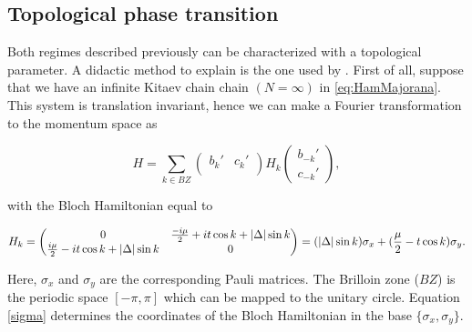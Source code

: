 


\subsection{Topological phase transition \label{subsec:top}}

Both regimes described previously  can be characterized with a topological parameter.  A didactic method to explain is the one used by \citeauthor{alicea_new_2012}\cite{alicea_new_2012}. First of all, suppose that we have an infinite Kitaev chain chain $(N=\infty)$ in  \eqref{eq:HamMajorana}. This system is translation invariant, hence we can make a Fourier transformation to the momentum space as

\begin{equation}
    H = 
    \sum_{k \in BZ} 
    \begin{pmatrix} 
      b_k'  & c_{k}'\\  
    \end{pmatrix}
    H_k 
    \begin{pmatrix} 
      b_{-k}'     \\ 
      c_{-k}' 
    \end{pmatrix},
    \label{PBCHam2}
\end{equation}

\noindent with the Bloch Hamiltonian equal to 

\begin{equation}
H_k = \begin{pmatrix} 
      0    &  \frac{-i \mu}{2} + it \cos k + \vert \Delta \vert  \sin k  \\ 
       \frac{i \mu}{2} - it \cos k + \vert \Delta \vert \sin k  &  0 
    \end{pmatrix}
    = (\vert \Delta \vert \sin k) \sigma_x + (\frac{\mu}{2}- t \cos k) \sigma_y.
\label{sigma}
\end{equation}




\noindent Here, $\sigma_x$ and $\sigma_y$ are the corresponding Pauli matrices. The Brilloin zone ($BZ$) is the periodic space  $[-\pi , \pi]$ which can be mapped to the unitary circle.   Equation \eqref{sigma} determines  the coordinates of the Bloch Hamiltonian in the base $\{\sigma_x, \sigma_y\}$. 


